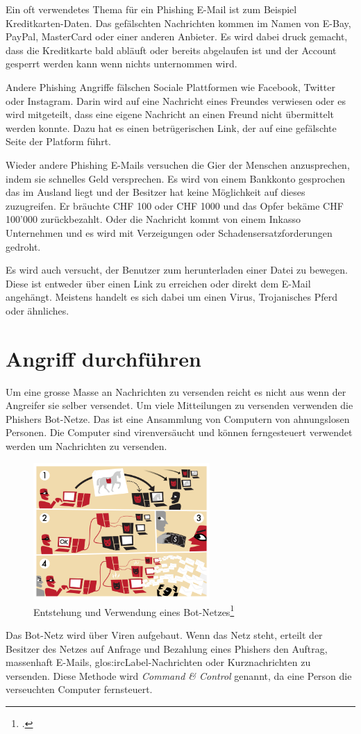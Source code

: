 Ein oft verwendetes Thema für ein Phishing E-Mail ist zum Beispiel Kreditkarten-Daten. Das gefälschten Nachrichten kommen im Namen von E-Bay, PayPal, MasterCard oder einer anderen Anbieter. Es wird dabei druck gemacht, dass die Kreditkarte bald abläuft oder bereits abgelaufen ist und der Account gesperrt werden kann wenn nichts unternommen wird. 

Andere Phishing Angriffe fälschen Sociale Plattformen wie Facebook, Twitter oder Instagram. Darin wird auf eine Nachricht eines Freundes verwiesen oder es wird mitgeteilt, dass eine eigene Nachricht an einen Freund nicht übermittelt werden konnte. Dazu hat es einen betrügerischen Link, der auf eine gefälschte Seite der Platform führt.

Wieder andere Phishing E-Mails versuchen die Gier der Menschen anzusprechen, indem sie schnelles Geld versprechen. Es wird von einem Bankkonto gesprochen das im Ausland liegt und der Besitzer hat keine Möglichkeit auf dieses zuzugreifen. Er bräuchte CHF 100 oder CHF 1000 und das Opfer bekäme CHF 100'000 zurückbezahlt. Oder die Nachricht kommt von einem Inkasso Unternehmen und es wird mit Verzeigungen oder Schadensersatzforderungen gedroht.

Es wird auch versucht, der Benutzer zum herunterladen einer Datei zu bewegen. Diese ist entweder über einen Link zu erreichen oder direkt dem E-Mail angehängt. Meistens handelt es sich dabei um einen Virus, Trojanisches Pferd oder ähnliches. 

\section{Angriff durchführen}
Um eine grosse Masse an Nachrichten zu versenden reicht es nicht aus wenn der Angreifer sie selber versendet. Um viele Mitteilungen zu versenden verwenden die Phishers Bot-Netze. Das ist eine Ansammlung von Computern von ahnungslosen Personen. Die Computer sind virenversäucht und können ferngesteuert verwendet werden um Nachrichten zu versenden.
\begin{figure}[H]
  \centering
  \includegraphics[width=0.6\textwidth]{images/botnet.png}
  \caption{Entstehung und Verwendung eines Bot-Netzes\footcite{Botnet__Wikipedia_2015-05-22}}
  \label{fig:phishing:angriffdurchfueren:botnetz}
\end{figure}
Das Bot-Netz wird über Viren aufgebaut. Wenn das Netz steht, erteilt der Besitzer des Netzes auf Anfrage und Bezahlung eines Phishers den Auftrag, massenhaft E-Mails, \Gls{glos:ircLabel}-Nachrichten oder Kurznachrichten zu versenden. Diese Methode wird \textit{Command \& Control} genannt, da eine Person die verseuchten Computer fernsteuert.

